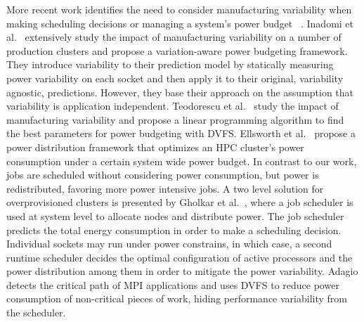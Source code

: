 More recent work identifies the need to consider manufacturing variability when making
scheduling decisions or managing a system's power budget
~\cite{Inadomi:2015:AMI:2807591.2807638,Gholkar:2016:PTH:2967938.2967961,Ellsworth:2015:DPS:2807591.2807643,Bailey:2015:FLP:2807591.2807637,Teodorescu:2008:VAS:1381306.1382152,Totoni:tech:2014}.
Inadomi et al.~\cite{Inadomi:2015:AMI:2807591.2807638} extensively study the impact of
manufacturing variability on a number of production clusters and propose a variation-aware
power budgeting framework.  They introduce variability to their prediction model by statically 
measuring power variability on
each socket and then apply it to their original, variability agnostic, predictions.  However,
they base their approach on the assumption that variability is application independent. 
Teodorescu et al.~\cite{Teodorescu:2008:VAS:1381306.1382152} study the impact
of manufacturing variability and propose a linear programming algorithm to find
the best parameters for power budgeting with DVFS.  Ellsworth et
al.~\cite{Ellsworth:2015:DPS:2807591.2807643} propose a power distribution
framework that optimizes an HPC cluster's power consumption under a certain
system wide power budget.  In contrast to our work, jobs are scheduled without
considering power consumption, but power is redistributed, favoring more power
intensive jobs.  A two level solution for overprovisioned clusters is presented
by Gholkar et al.~\cite{Gholkar:2016:PTH:2967938.2967961}, where a job
scheduler is used at system level to allocate nodes and distribute power.  The
job scheduler predicts the total energy consumption in order to make a
scheduling decision.  Individual sockets may run under power constrains, in
which case, a second runtime scheduler decides the optimal configuration of
active processors and the power distribution among them in order to mitigate
the power variability.  Adagio \cite{rountree2009} detects the critical path of
MPI applications and uses DVFS to reduce power consumption of non-critical
pieces of work, hiding performance variability from the scheduler.

